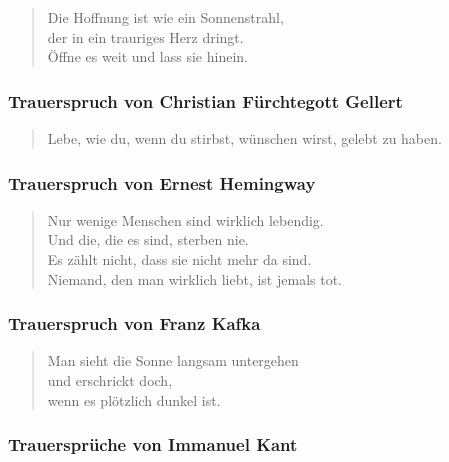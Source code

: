 \documentclass[ngerman,a4paper,11pt]{scrreprt}
\begin{document}
\begin{verse}
Die Hoffnung ist wie ein Sonnenstrahl, \\
der in ein trauriges Herz dringt. \\
Öffne es weit und lass sie hinein. \\
\end{verse}

\subsubsection*{Trauerspruch von Christian Fürchtegott Gellert}
\label{sec-1-1-1-3-9}

\begin{verse}
Lebe, wie du, wenn du stirbst, wünschen wirst, gelebt zu haben. \\
\end{verse}

\subsubsection*{Trauerspruch von Ernest Hemingway}
\label{sec-1-1-1-3-10}

\begin{verse}
Nur wenige Menschen sind wirklich lebendig. \\
Und die, die es sind, sterben nie. \\
Es zählt nicht, dass sie nicht mehr da sind. \\
Niemand, den man wirklich liebt, ist jemals tot. \\
\end{verse}

\subsubsection*{Trauerspruch von Franz Kafka}
\label{sec-1-1-1-3-11}

\begin{verse}
Man sieht die Sonne langsam untergehen \\
und erschrickt doch, \\
wenn es plötzlich dunkel ist. \\
\end{verse}

\subsubsection*{Trauersprüche von Immanuel Kant}
\label{sec-1-1-1-3-12}
\end{document}
